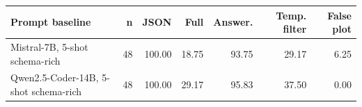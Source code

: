 \begin{tabular}{lrrrrrr}
\toprule
Prompt baseline & n & JSON & Full & Answer. & Temp. filter & False plot \\
\midrule
Mistral-7B, 5-shot schema-rich & 48 & 100.00 & 18.75 & 93.75 & 29.17 & 6.25 \\
Qwen2.5-Coder-14B, 5-shot schema-rich & 48 & 100.00 & 29.17 & 95.83 & 37.50 & 0.00 \\
\bottomrule
\end{tabular}
